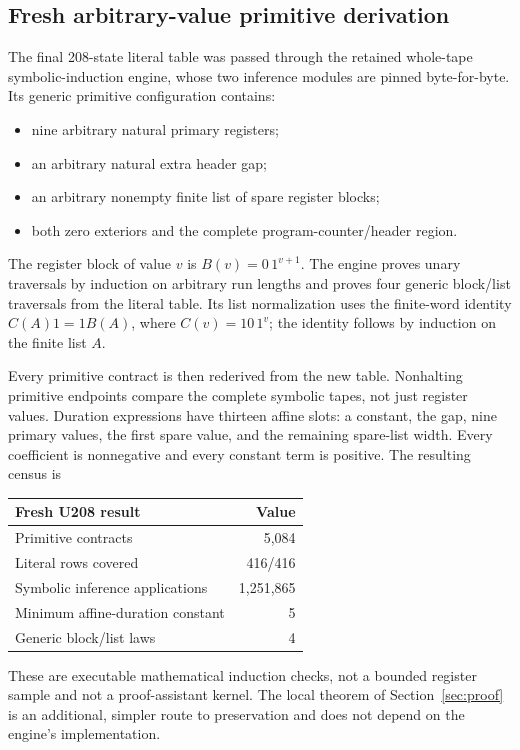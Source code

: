 \documentclass[11pt,letterpaper]{article}
\begin{document}
\subsection{Fresh arbitrary-value primitive derivation}
The final 208-state literal table was passed through the retained
whole-tape symbolic-induction engine, whose two inference modules are
pinned byte-for-byte. Its generic primitive configuration contains:
\begin{itemize}
\item nine arbitrary natural primary registers;
\item an arbitrary natural extra header gap;
\item an arbitrary nonempty finite list of spare register blocks;
\item both zero exteriors and the complete program-counter/header region.
\end{itemize}
The register block of value $v$ is $B(v)=0\,1^{v+1}$.
The engine proves unary traversals by induction on arbitrary run lengths
and proves four generic block/list traversals from the literal table.
Its list normalization uses the finite-word identity
$C(A)1=1B(A)$, where $C(v)=10\,1^v$; the identity follows by induction on
the finite list $A$.

Every primitive contract is then rederived from the new table.
Nonhalting primitive endpoints compare the complete symbolic tapes, not
just register values. Duration expressions have thirteen affine slots:
a constant, the gap, nine primary values, the first spare value, and the
remaining spare-list width. Every coefficient is nonnegative and every
constant term is positive. The resulting census is
\begin{center}
\begin{tabular}{@{}lr@{}}
\toprule
Fresh U208 result & Value\\
\midrule
Primitive contracts & 5,084\\
Literal rows covered & 416/416\\
Symbolic inference applications & 1,251,865\\
Minimum affine-duration constant & 5\\
Generic block/list laws & 4\\
\bottomrule
\end{tabular}
\end{center}
These are executable mathematical induction checks, not a bounded register
sample and not a proof-assistant kernel. The local theorem of
Section~\ref{sec:proof} is an additional, simpler route to preservation and
does not depend on the engine's implementation.
\end{document}
